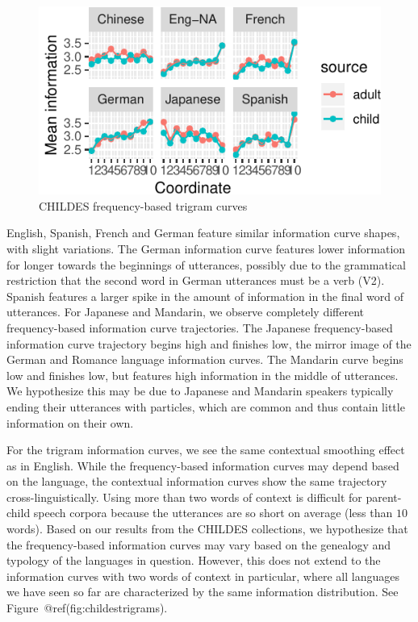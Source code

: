 \documentclass[10pt, letterpaper]{article}
\newenvironment{CodeChunk}{}{}
\begin{document}
\begin{CodeChunk}
\begin{figure}[tb]
\includegraphics{figs/childesunigrams-1} \caption[CHILDES frequency-based trigram curves]{CHILDES frequency-based trigram curves}\label{fig:childesunigrams}
\end{figure}
\end{CodeChunk}

English, Spanish, French and German feature similar information curve
shapes, with slight variations. The German information curve features
lower information for longer towards the beginnings of utterances,
possibly due to the grammatical restriction that the second word in
German utterances must be a verb (V2). Spanish features a larger spike
in the amount of information in the final word of utterances. For
Japanese and Mandarin, we observe completely different frequency-based
information curve trajectories. The Japanese frequency-based information
curve trajectory begins high and finishes low, the mirror image of the
German and Romance language information curves. The Mandarin curve
begins low and finishes low, but features high information in the middle
of utterances. We hypothesize this may be due to Japanese and Mandarin
speakers typically ending their utterances with particles, which are
common and thus contain little information on their own.

For the trigram information curves, we see the same contextual smoothing
effect as in English. While the frequency-based information curves may
depend based on the language, the contextual information curves show the
same trajectory cross-linguistically. Using more than two words of
context is difficult for parent-child speech corpora because the
utterances are so short on average (less than \(10\) words). Based on
our results from the CHILDES collections, we hypothesize that the
frequency-based information curves may vary based on the genealogy and
typology of the languages in question. However, this does not extend to
the information curves with two words of context in particular, where
all languages we have seen so far are characterized by the same
information distribution. See Figure~@ref(fig:childestrigrams).
\end{document}
